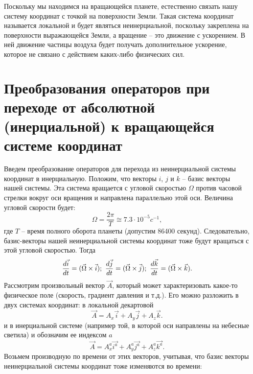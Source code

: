     Поскольку мы находимся на вращающейся планете, естественно связать нашу систему координат с точкой на поверхности Земли. Такая система координат называется локальной и будет являться неинерциальной, поскольку закреплена на поверхности выражающейся Земли, а вращение -- это движение с ускорением. В ней движение частицы воздуха будет получать дополнительное ускорение, которое не связано с действием каких-либо физических сил. 
    
\section{{\color{vms} Преобразования операторов при переходе от абсолютной (инерциальной) к вращающейся системе координат}}
    
    Введем преобразование операторов для перехода из неинерциальной системы координат в инерциальную. Положим, что векторы $i$, $j$ и $k$ -- базис векторы нашей системы. Эта система вращается с угловой скоростью $\Omega$ против часовой стрелки вокруг оси вращения и направлена параллельно этой оси. Величина угловой скорости будет:
    \begin{equation}
        \Omega = \frac{2\pi}{T} \cong 7.3\cdot10^{-5} c^{-1},
    \end{equation}
    где $T$ -- время полного оборота планеты (допустим 86400 секунд). Следовательно, базис-векторы нашей неинерциальной системы координат тоже будут вращаться с этой угловой скоростью. Тогда 
    \begin{equation}
    \label{omega}
        \displaystyle\frac{d \vec{i}}{d t}=(\vec{\Omega}\times\vec{i}); \
        \displaystyle\frac{d \vec{j}}{d t}=(\vec{\Omega}\times\vec{j}); \
        \displaystyle\frac{d \vec{k}}{d t}=(\vec{\Omega}\times\vec{k}).   
    \end{equation}
    Рассмотрим произвольный вектор $\vec{A}$, который может характеризовать какое-то физическое поле (скорость, градиент давления и т.д.). Его можно разложить в двух системах координат: в локальной декартовой
    \begin{equation}
        \vec{A} = A_x\vec{i}+A_y\vec{j}+A_z\vec{k}. 
    \end{equation}
    и в инерциальной системе (например той, в которой оси направлены на небесные светила) и обозначим ее индексом $a$
    \begin{equation}
        \vec{A} = A_x^a\vec{i^a}+A_y^a\vec{j^a}+A_z^a\vec{k^a}.
    \end{equation}
    Возьмем производную по времени от этих векторов, учитывая, что базис векторы неинерциальной системы координат тоже изменяются во времени:
